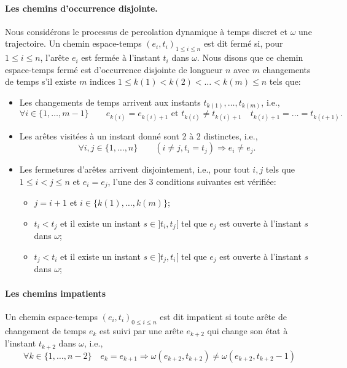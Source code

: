 \documentclass[titlepage,a4paper,12pt]{article}
\newcounter{d}
\newcounter{t}
\newcounter{p}
\newcounter{c}
\newcounter{a}
\newcounter{l}
\begin{document}
\paragraph{Les chemins d'occurrence disjointe.}Nous considérons le processus de percolation dynamique à temps discret et $\omega$ une trajectoire. Un chemin espace-temps $(e_i,t_i)_{1\leqslant i \leqslant n}$ est dit fermé si, pour $1\leqslant i\leqslant n$, l'arête $e_i$ est fermée à l'instant $t_i$ dans $\omega$. Nous disons que ce chemin espace-temps fermé est d'occurrence disjointe de longueur $n$ avec $m$ changements de temps s'il existe $m$ indices $1\leqslant k(1)< k(2) < \dots < k(m) \leqslant n$ tels que:
\begin{itemize}[label = $\bullet$, leftmargin = *]
\item Les changements de temps arrivent aux instants $t_{k(1)},\dots, t_{k(m)}$, i.e.,
$$\forall i\in \{1,\dots, m-1\} \qquad e_{k(i)} = e_{k(i)+1}\text{ et }t_{k(i)} \neq t_{k(i)+1} \quad t_{k(i)+1} =\dots = t_{k(i+1)}.
$$
\item Les arêtes visitées à un instant donné sont 2 à 2 distinctes, i.e.,
$$ \forall i,j \in \{1,\dots, n\} \qquad (i\neq j, t_i = t_j) \Rightarrow e_i\neq e_j.
$$
\item Les fermetures d'arêtes arrivent disjointement, i.e., pour tout $i,j$ tels que $1\leqslant i<j \leqslant n$ et $e_i = e_j$, l'une des 3 conditions suivantes est vérifiée:
\begin{itemize}[label=$\diamond$]
\item $j=i+1$ et $i\in \{k(1),\dots, k(m)\}$;
\item $t_i< t_j$ et il existe un instant $s\in ]t_i,t_j[$ tel que $e_j$ est ouverte à l'instant $s$ dans $\omega$;
\item $t_j< t_i$ et il existe un instant $s\in ]t_j,t_i[$ tel que $e_j$ est ouverte à l'instant $s$ dans $\omega$;
\end{itemize}
\end{itemize}
\paragraph{Les chemins impatients}
Un chemin espace-temps $(e_i,t_i)_{0\leqslant i \leqslant n}$ est dit impatient si toute arête de changement de temps $e_k$ est suivi par une arête $e_{k+2}$ qui change son état à l'instant $t_{k+2}$ dans $\omega$, i.e.,
$$ \forall k \in \{1,\dots,n-2\} \quad e_k = e_{k+1} \Rightarrow \omega(e_{k+2},t_{k+2}) \neq \omega(e_{k+2},t_{k+2}-1)
$$
\end{document}
